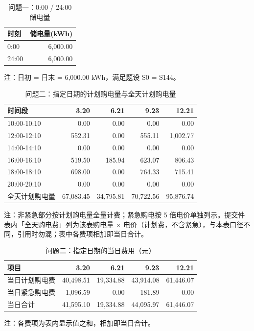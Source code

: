 \begin{table}[htbp]
\centering
\caption{问题一：0:00 / 24:00 储电量}
\label{tab:q1-b1}
\small
\setlength{\tabcolsep}{4pt}
\begin{tabular}{lr}
\toprule
时刻 & 储电量(kWh) \\
\midrule
0:00 & 6,000.00 \\
24:00 & 6,000.00 \\
\bottomrule
\end{tabular}
\vspace{2pt}
\begin{flushleft}\footnotesize 注：日初 = 日末 = 6,000.00 kWh，满足题设 S0 = S144。\end{flushleft}
\end{table}
\begin{table}[htbp]
\centering
\caption{问题二：指定日期的计划购电量与全天计划购电量}
\label{tab:q2-a}
\small
\setlength{\tabcolsep}{4pt}
\begin{tabular}{lrrrr}
\toprule
时间段 & 3.20 & 6.21 & 9.23 & 12.21 \\
\midrule
10:00-10:10 & 0.00 & 0.00 & 0.00 & 0.00 \\
12:00-12:10 & 552.31 & 0.00 & 555.11 & 1,002.77 \\
14:00-14:10 & 0.00 & 0.00 & 0.00 & 0.00 \\
16:00-16:10 & 519.50 & 185.94 & 623.07 & 806.43 \\
18:00-18:10 & 698.00 & 0.00 & 764.33 & 715.41 \\
20:00-20:10 & 0.00 & 0.00 & 0.00 & 0.00 \\
全天计划购电量 & 67,083.45 & 34,795.81 & 70,722.56 & 95,876.74 \\
\bottomrule
\end{tabular}
\vspace{2pt}
\begin{flushleft}\footnotesize 注：非紧急部分按计划购电量全量计费；紧急购电按 5 倍电价单独列示。提交件表内「全天购电费」列为该表购电量 × 电价（计划费，不含紧急），与本表口径不同，引用时勿混；表中各费项相加即当日合计。\end{flushleft}
\end{table}
\begin{table}[htbp]
\centering
\caption{问题二：指定日期的当日费用（元）}
\label{tab:q2-a2}
\small
\setlength{\tabcolsep}{4pt}
\begin{tabular}{lrrrr}
\toprule
项目 & 3.20 & 6.21 & 9.23 & 12.21 \\
\midrule
当日计划购电费 & 40,498.51 & 19,334.88 & 43,914.08 & 61,446.07 \\
当日紧急购电费 & 1,096.59 & 0.00 & 181.89 & 0.00 \\
当日合计 & 41,595.10 & 19,334.88 & 44,095.97 & 61,446.07 \\
\bottomrule
\end{tabular}
\vspace{2pt}
\begin{flushleft}\footnotesize 注：各费项为表内显示值之和，相加即当日合计。\end{flushleft}
\end{table}
